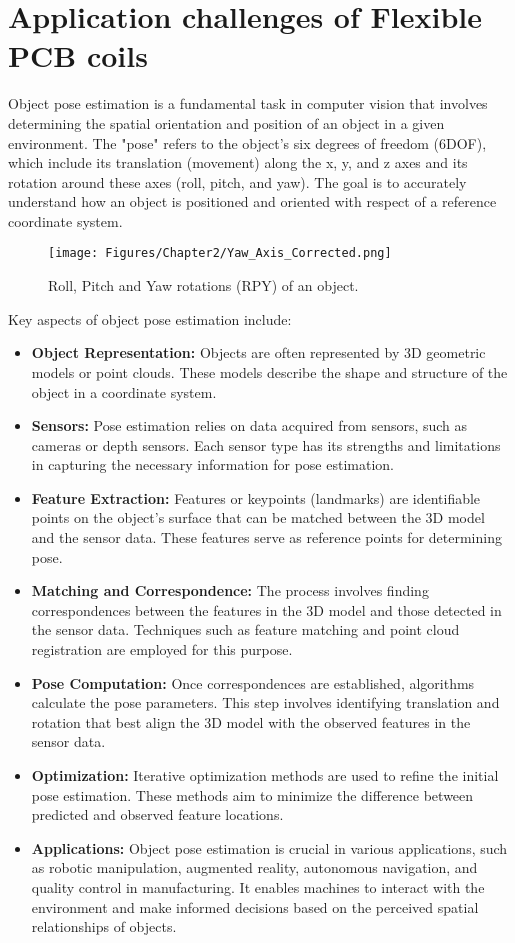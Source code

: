 \section{Application challenges of Flexible PCB coils}
Object pose estimation is a fundamental task in computer vision that involves determining the spatial orientation and position of an object in a given environment. The "pose" refers to the object's six degrees of freedom (6DOF), which include its translation (movement) along the x, y, and z axes and its rotation around these axes (roll, pitch, and yaw). The goal is to accurately understand how an object is positioned and oriented with respect of a reference coordinate system.

\begin{figure}[th]
    \centering
    \texttt{[image: Figures/Chapter2/Yaw\_Axis\_Corrected.png]}
    \caption[Roll, Pitch and Yaw rotations (RPY) of an object.]{Roll, Pitch and Yaw rotations (RPY) of an object.}
    \label{fig:RPY}
\end{figure}

Key aspects of object pose estimation include:
\begin{itemize}
    \item \textbf{Object Representation:} Objects are often represented by 3D geometric models or point clouds. These models describe the shape and structure of the object in a coordinate system.
    \item \textbf{Sensors:} Pose estimation relies on data acquired from sensors, such as cameras or depth sensors. Each sensor type has its strengths and limitations in capturing the necessary information for pose estimation.
    \item \textbf{Feature Extraction:} Features or keypoints (landmarks) are identifiable points on the object's surface that can be matched between the 3D model and the sensor data. These features serve as reference points for determining pose.
    \item \textbf{Matching and Correspondence:} The process involves finding correspondences between the features in the 3D model and those detected in the sensor data. Techniques such as feature matching and point cloud registration are employed for this purpose.
    \item \textbf{Pose Computation:} Once correspondences are established, algorithms calculate the pose parameters. This step involves identifying translation and rotation that best align the 3D model with the observed features in the sensor data.
    \item \textbf{Optimization:} Iterative optimization methods are used to refine the initial pose estimation. These methods aim to minimize the difference between predicted and observed feature locations.
    \item \textbf{Applications:} Object pose estimation is crucial in various applications, such as robotic manipulation, augmented reality, autonomous navigation, and quality control in manufacturing. It enables machines to interact with the environment and make informed decisions based on the perceived spatial relationships of objects.
\end{itemize}

